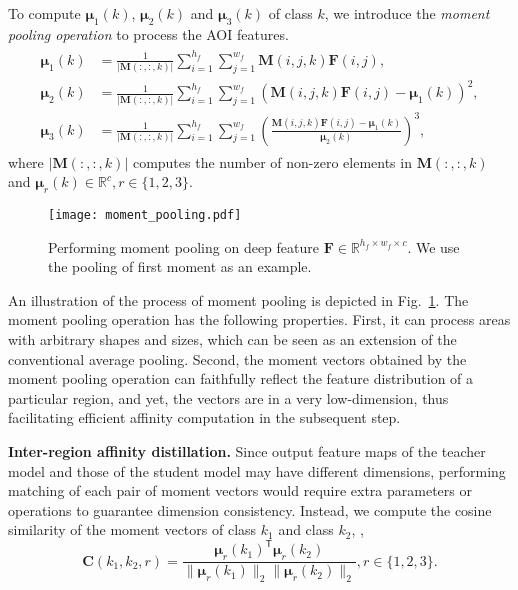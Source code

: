 \documentclass[10pt,twocolumn,letterpaper]{article}
\newcommand{\trans}[1]{{#1}^{\ensuremath{\mathsf{T}}}}
\begin{document}
To compute $\boldsymbol{\mu}_{1}(k)$, $\boldsymbol{\mu}_{2}(k)$ and $\boldsymbol{\mu}_{3}(k)$ of class $k$, we introduce the \textit{moment pooling operation} to process the AOI features. 
\begin{align}
\label{eqn:pooling_op}
\begin{split}
\boldsymbol{\mu}_{1}(k) &= \frac{1}{|\textbf{M}(:, :, k)|} \sum_{i=1}^{h_{f}} \sum_{j=1}^{w_{f}} \mathbf{M}(i, j, k) \mathbf{F}(i, j),
\\
\boldsymbol{\mu}_{2}(k) &= \frac{1}{|\textbf{M}(:, :, k)|} \sum_{i=1}^{h_{f}} \sum_{j=1}^{w_{f}} (\mathbf{M}(i, j, k) \mathbf{F}(i, j) - \boldsymbol{\mu}_{1}(k))^{2},
\\
\boldsymbol{\mu}_{3}(k) &= \frac{1}{|\mathbf{M}(:, :, k)|} \sum_{i=1}^{h_{f}} \sum_{j=1}^{w_{f}} \left(\frac{\mathbf{M}(i, j, k) \mathbf{F}(i, j) - \boldsymbol{\mu}_{1}(k)}{\boldsymbol{\mu}_{2}(k)}\right)^{3},
\end{split}
\end{align}
where $|\mathbf{M}(:, :, k)|$ computes the number of non-zero elements in $\mathbf{M}(:, :, k)$ and $\boldsymbol{\mu}_{r}(k) \in \mathbb{R}^{c}, r \in \{1, 2, 3\}$. 

\begin{figure}[t]
  \centering
  \texttt{[image: moment\_pooling.pdf]}
  \caption{Performing moment pooling on deep feature $\mathbf{F} \in \mathbb{R}^{h_{f} \times w_{f} \times c}$. We use the pooling of first moment as an example.}
  \centering
  \vskip -0.4cm
  \label{fig:moment_pooling}
\end{figure}

An illustration of the process of moment pooling is depicted in Fig.~\ref{fig:moment_pooling}.
The moment pooling operation has the following properties. First, it can process areas with arbitrary shapes and sizes, which can be seen as an extension of the conventional average pooling. Second, the moment vectors obtained by the moment pooling operation can faithfully reflect the feature distribution of a particular region, and yet, the vectors are in a very low-dimension, thus facilitating efficient affinity computation in the subsequent step. 



\vspace{0.1cm}
\noindent \textbf{Inter-region affinity distillation.}
Since output feature maps of the teacher model and those of the student model may have different dimensions, performing matching of each pair of moment vectors would require extra parameters or operations to guarantee dimension consistency. Instead, we compute the cosine similarity of the moment vectors of class $k_{1}$ and class $k_{2}$, \ie, 
\begin{equation}
\label{eqn:inter_region_mean_loss}
\mathbf{C}(k_{1}, k_{2}, r) = \frac{\trans{\boldsymbol{\mu}_{r}(k_{1})} \boldsymbol{\mu}_{r}(k_{2})}{\|\boldsymbol{\mu}_{r}(k_{1})\|_{2}\|\boldsymbol{\mu}_{r}(k_{2})\|_{2}}, r \in \{1, 2, 3\}.
\end{equation}
\end{document}
